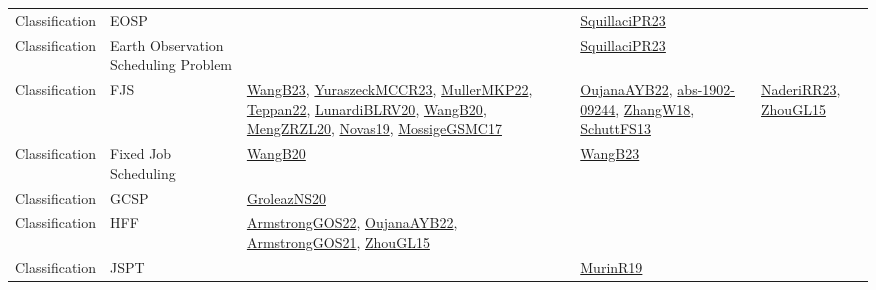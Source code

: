 {\begin{longtable}{lp{3cm}>{\raggedright}p{6cm}>{\raggedright}p{6cm}p{8cm}}
Classification & EOSP &  & \href{papers/SquillaciPR23.pdf}{SquillaciPR23}\cite{SquillaciPR23} & \\
Classification & Earth Observation Scheduling Problem &  & \href{papers/SquillaciPR23.pdf}{SquillaciPR23}\cite{SquillaciPR23} & \\
Classification & FJS & \href{papers/WangB23.pdf}{WangB23}\cite{WangB23}, \href{articles/YuraszeckMCCR23.pdf}{YuraszeckMCCR23}\cite{YuraszeckMCCR23}, \href{articles/MullerMKP22.pdf}{MullerMKP22}\cite{MullerMKP22}, \href{papers/Teppan22.pdf}{Teppan22}\cite{Teppan22}, \href{articles/LunardiBLRV20.pdf}{LunardiBLRV20}\cite{LunardiBLRV20}, \href{papers/WangB20.pdf}{WangB20}\cite{WangB20}, \href{articles/MengZRZL20.pdf}{MengZRZL20}\cite{MengZRZL20}, \href{articles/Novas19.pdf}{Novas19}\cite{Novas19}, \href{papers/MossigeGSMC17.pdf}{MossigeGSMC17}\cite{MossigeGSMC17} & \href{papers/OujanaAYB22.pdf}{OujanaAYB22}\cite{OujanaAYB22}, \href{articles/abs-1902-09244.pdf}{abs-1902-09244}\cite{abs-1902-09244}, \href{articles/ZhangW18.pdf}{ZhangW18}\cite{ZhangW18}, \href{papers/SchuttFS13.pdf}{SchuttFS13}\cite{SchuttFS13} & \href{articles/NaderiRR23.pdf}{NaderiRR23}\cite{NaderiRR23}, \href{papers/ZhouGL15.pdf}{ZhouGL15}\cite{ZhouGL15}\\
Classification & Fixed Job Scheduling & \href{papers/WangB20.pdf}{WangB20}\cite{WangB20} & \href{papers/WangB23.pdf}{WangB23}\cite{WangB23} & \\
Classification & GCSP & \href{papers/GroleazNS20.pdf}{GroleazNS20}\cite{GroleazNS20} &  & \\
Classification & HFF & \href{papers/ArmstrongGOS22.pdf}{ArmstrongGOS22}\cite{ArmstrongGOS22}, \href{papers/OujanaAYB22.pdf}{OujanaAYB22}\cite{OujanaAYB22}, \href{papers/ArmstrongGOS21.pdf}{ArmstrongGOS21}\cite{ArmstrongGOS21}, \href{papers/ZhouGL15.pdf}{ZhouGL15}\cite{ZhouGL15} &  & \\
Classification & JSPT &  & \href{papers/MurinR19.pdf}{MurinR19}\cite{MurinR19} & \\

\end{longtable}}
